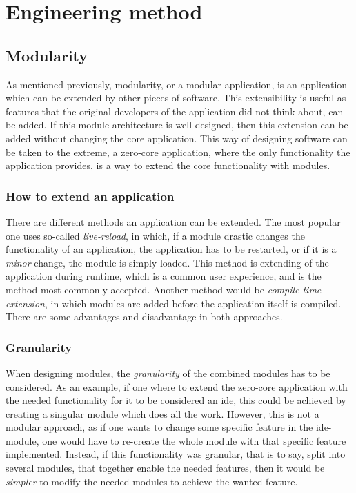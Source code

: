 \chapter{Engineering method}


\section{Modularity}

As mentioned previously, modularity, or a modular application, is an application
which can be extended by other pieces of software. This extensibility is useful
as features that the original developers of the application did not think about,
can be added. If this module architecture is well-designed, then this extension
can be added without changing the core application. This way of designing
software can be taken to the extreme, a zero-core application, where the only
functionality the application provides, is a way to extend the core functionality
with modules.

\subsection{How to extend an application}

There are different methods an application can be extended. The most popular one
 uses so-called \textit{live-reload}, in which, if a module
drastic changes the functionality of an application, the application has to be
restarted, or if it is a \textit{minor} change, the module is simply loaded.
This method is extending of the application during runtime, which is a common
user experience, and is the method most commonly accepted. Another method
would be \textit{compile-time-extension}, in which modules are added before the
application itself is compiled. There are some advantages and disadvantage in
both approaches.

\subsection{Granularity}

When designing modules, the \textit{granularity} of the combined modules has to
be considered. As an example, if one where to extend the zero-core application
with the needed functionality for it to be considered an \gls{ide}, this could be
achieved by creating a singular module which does all the work. However, this
is not a modular approach, as if one wants to change some specific feature in
the \gls{ide}-module, one would have to re-create the whole module with that
specific feature implemented. Instead, if this functionality was granular,
that is to say, split into several modules, that together enable the needed
features, then it would be \textit{simpler} to modify the needed modules to
achieve the wanted feature.

